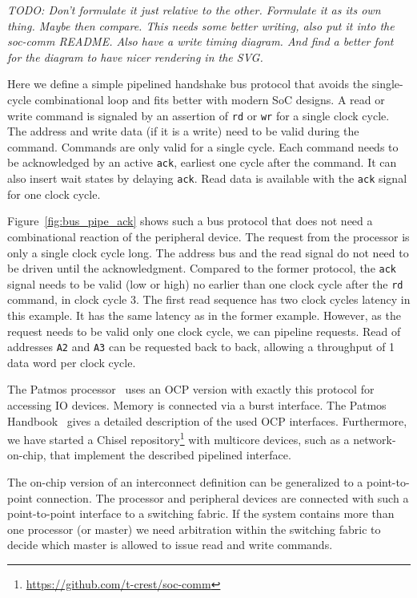 \documentclass[%
    10pt,
    headinclude, footexclude,
    openright, %
    notitlepage,
    cleardoubleempty,
    headsepline,
    pointlessnumbers,
    bibtotoc, idxtotoc,
    ]{scrbook}
\newcommand{\code}[1]{{\lstinline[basicstyle=\small\ttfamily]{#1}}}
\newcommand{\todo}[1]{{\emph{TODO: #1}}}
\newcommand{\myref}[2]{\href{#1}{#2}}
\renewcommand{\myref}[2]{{#2}{\footnote{\url{#1}}}}
\begin{document}
\todo{Don't formulate it just relative to the other. Formulate it as its own thing.
Maybe then compare. This needs some better writing, also put it into the soc-comm README.
Also have a write timing diagram. And find a better font for the diagram to have nicer
rendering in the SVG.}

Here we define a simple pipelined handshake bus protocol that avoids the single-cycle combinational loop and fits better with modern SoC designs.
 A read or write command is signaled by an assertion of \code{rd} or \code{wr}
 for a single clock cycle.
The address and write data (if it is a write) need to be valid during
the command. Commands are only valid for a single cycle.
Each command needs to be acknowledged by an active \code{ack},
earliest one cycle after the command. It can also insert wait
states by delaying \code{ack}. Read data is available with the \code{ack}
signal for one clock cycle.

Figure~\ref{fig:bus_pipe_ack} shows such a bus protocol that does not need
a combinational reaction of the peripheral device. The request from the processor
is only a single clock cycle long. The address bus and the read signal do not need to be driven
until the acknowledgment. Compared to the former protocol, the \code{ack} signal needs to
be valid (low or high)
no earlier than one clock cycle after the \code{rd} command, in clock cycle 3.
The first read sequence has two clock cycles latency in this example.
It has the same latency as in the former example.
However, as the request needs to be valid only one clock cycle, we can pipeline
requests. Read of addresses \code{A2} and \code{A3} can be requested back to back,
allowing a throughput of 1 data word per clock cycle.

The Patmos processor~\cite{patmos:rts2018} uses an OCP version with exactly this
protocol for accessing IO devices. Memory is connected via a burst interface.
The Patmos Handbook~\cite{patmos:handbook} gives a detailed description of the
used OCP interfaces.
Furthermore, we have started a
\myref{https://github.com/t-crest/soc-comm}{Chisel repository} with multicore devices, such as
a network-on-chip, that implement the described pipelined interface.

The on-chip version of an interconnect definition can be generalized to a point-to-point
connection. The processor and peripheral devices are connected with such a point-to-point
interface to a switching fabric. If the system contains more than one processor (or master)
we need arbitration within the switching fabric to decide which master is allowed to issue
read and write commands.
\end{document}
